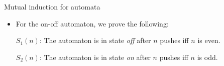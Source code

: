 \documentclass[style=sailor,size=12pt]{powerdot}
\begin{document}

\begin{wideslide}[bm=,toc=]{Mutual induction for automata}
\begin{itemize}
\item For the on-off automaton, we prove the following:

\vspace{2em}
$S_1(n)$: The automaton is in state {\em off\/} after $n$ pushes iff $n$ is even.

$S_2(n)$: The automaton is in state {\em on\/} after $n$ pushes iff $n$ is odd.
\end{itemize}
\end{wideslide}
\end{document}
